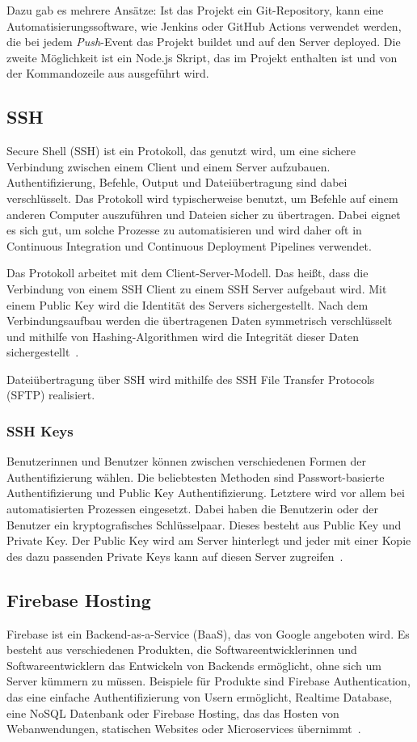 Dazu gab es mehrere Ansätze: Ist das Projekt ein Git-Repository, kann eine
Automatisierungssoftware, wie Jenkins oder GitHub Actions verwendet werden,
die bei jedem \textit{Push}-Event das Projekt buildet und auf den Server
deployed.
 Die zweite Möglichkeit ist ein Node.js Skript, das im Projekt enthalten ist und von der Kommandozeile
 aus ausgeführt wird.

\subsection{SSH}
Secure Shell (SSH) ist ein Protokoll, das genutzt wird, um eine sichere Verbindung zwischen einem
Client und einem Server aufzubauen.
 Authentifizierung, Befehle, Output und Dateiübertragung sind dabei verschlüsselt.
 Das Protokoll wird typischerweise benutzt, um Befehle auf einem anderen Computer auszuführen und Dateien sicher
 zu übertragen.
 Dabei eignet es sich gut, um solche Prozesse zu automatisieren und wird daher oft in Continuous Integration und
Continuous Deployment Pipelines verwendet.

Das Protokoll arbeitet mit dem Client-Server-Modell.
 Das heißt, dass die Verbindung von einem SSH Client zu einem SSH Server aufgebaut wird.
 Mit einem Public Key wird die Identität des Servers sichergestellt.
 Nach dem Verbindungsaufbau werden die übertragenen Daten symmetrisch verschlüsselt und mithilfe von
 Hashing-Algorithmen wird die Integrität dieser Daten sichergestellt~\cite{ssh}.

Dateiübertragung über SSH wird mithilfe des SSH File Transfer Protocols (SFTP) realisiert.

\subsubsection{SSH Keys}
Benutzerinnen und Benutzer können zwischen verschiedenen Formen der Authentifizierung wählen.
Die beliebtesten Methoden sind Passwort-basierte Authentifizierung und Public Key Authentifizierung.
Letztere wird vor allem bei automatisierten Prozessen eingesetzt.
Dabei haben die Benutzerin oder der Benutzer ein kryptografisches Schlüsselpaar.
Dieses besteht aus Public Key und Private Key.
Der Public Key wird am Server hinterlegt und jeder mit einer Kopie des dazu passenden Private Keys kann
auf diesen Server zugreifen~\cite{ssh-keys}.

\subsection{Firebase Hosting}
Firebase ist ein Backend-as-a-Service (BaaS), das von Google angeboten wird.
 Es besteht aus verschiedenen Produkten, die Softwareentwicklerinnen und Softwareentwicklern das Entwickeln
von Backends ermöglicht, ohne sich um Server kümmern zu müssen.
 Beispiele für Produkte sind Firebase Authentication, das eine einfache Authentifizierung von Usern ermöglicht,
Realtime Database, eine NoSQL Datenbank oder Firebase Hosting, das das Hosten von Webanwendungen,
statischen Websites oder Microservices übernimmt~\cite{firebase}.

